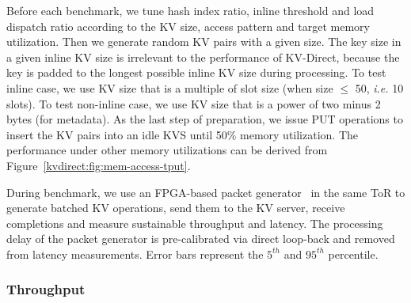 Before each benchmark, we tune hash index ratio, inline threshold and load dispatch ratio according to the KV size, access pattern and target memory utilization.
Then we generate random KV pairs with a given size.
The key size in a given inline KV size is irrelevant to the performance of KV-Direct, because the key is padded to the longest possible inline KV size during processing.
To test inline case, we use KV size that is a multiple of slot size (when size $\leq$ 50, \textit{i.e.} 10 slots). To test non-inline case, we use KV size that is a power of two minus 2 bytes (for metadata).
As the last step of preparation, we issue PUT operations to insert the KV pairs into an idle KVS until 50\% memory utilization.
The performance under other memory utilizations can be derived from Figure~\ref{kvdirect:fig:mem-access-tput}.

During benchmark, we use an FPGA-based packet generator~\cite{li2016clicknp} in the same ToR to generate batched KV operations, send them to the KV server, receive completions and measure sustainable throughput and latency.
The processing delay of the packet generator is pre-calibrated via direct loop-back and removed from latency measurements.
Error bars represent the $5^{th}$ and $95^{th}$ percentile.

\subsubsection{Throughput}

